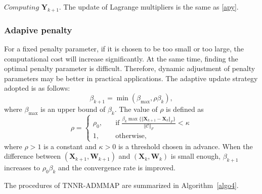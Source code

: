\documentclass{article}
\begin{document}
{$\textit{Computing}$  $\mathbf Y_{k+1}$. The update of Lagrange multipliers is the same as \eqref{apy}.

\subsubsection{Adapive penalty}
For a fixed penalty parameter, if it is chosen to be too small or too large, the computational cost will increase significantly. At the same time, finding the optimal penalty parameter is difficult. Therefore, dynamic adjustment of penalty parameters may be better in practical applications. The adaptive update strategy adopted is as follows:
\begin{equation}
    \beta_{k+1} = \min(\beta_{\max}, \rho \beta_k),\label{beta1}
\end{equation}
where $\beta_{\max}$ is an upper bound of $\beta_k$. The value of $\rho$ is defined as
\begin{equation}
    \rho = \left\{
        \begin{aligned}
            \rho_0, \quad & \text{if} \; \frac{\beta_k \max\{ \Vert\mathbf X_{k+1} - \mathbf X_k \Vert_F \}}{ \Vert \mathcal{C} \Vert_F} < \kappa \\
            1, \quad & \text{otherwise},
        \end{aligned}
    \right.
    \label{beta2}
\end{equation}
where $\rho > 1$ is a constant and $\kappa >0 $ is a threshold chosen in advance. When the difference between $(\mathbf X_{k+1}, \mathbf W_{k+1})$ and $(\mathbf X_{k}, \mathbf W_{k})$ is small enough, $\beta_{k+1}$ increases to $\rho_0\beta_k$ and the convergence rate is improved.

The procedures of TNNR-ADMMAP are summarized in Algorithm~\ref{algo4}.

}
\end{document}
